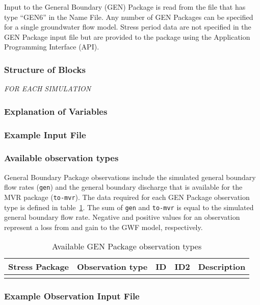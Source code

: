Input to the General Boundary (GEN) Package is read from the file that has type ``GEN6'' in the Name File.  Any number of GEN Packages can be specified for a single groundwater flow model. Stress period data are not specified in the GEN Package input file but are provided to the package using the \mff Application Programming Interface (API).

\vspace{5mm}
\subsubsection{Structure of Blocks}
\vspace{5mm}

\noindent \textit{FOR EACH SIMULATION}



\vspace{5mm}
\subsubsection{Explanation of Variables}
\begin{description}

\end{description}

\vspace{5mm}
\subsubsection{Example Input File}


\vspace{5mm}
\subsubsection{Available observation types}
General Boundary Package observations include the simulated general boundary flow rates (\texttt{gen}) and the general boundary discharge that is available for the MVR package (\texttt{to-mvr}). The data required for each GEN Package observation type is defined in table~\ref{table:gwf-genobstype}. The sum of \texttt{gen} and \texttt{to-mvr} is equal to the simulated general boundary flow rate. Negative and positive values for an observation represent a loss from and gain to the GWF model, respectively.

\begin{longtable}{p{2cm} p{2.75cm} p{2cm} p{1.25cm} p{7cm}}
\caption{Available GEN Package observation types} \tabularnewline

\hline
\hline
\textbf{Stress Package} & \textbf{Observation type} & \textbf{ID} & \textbf{ID2} & \textbf{Description} \\
\hline
\endhead

\hline
\endfoot


\label{table:gwf-genobstype}
\end{longtable}

\vspace{5mm}
\subsubsection{Example Observation Input File}


